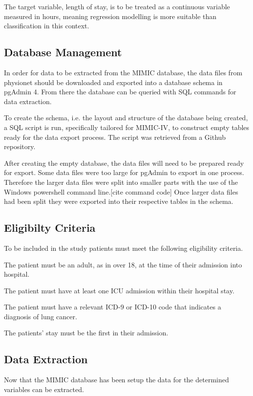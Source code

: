 \documentclass[11pt]{article}
\begin{document}
The target variable, length of stay, is to be treated as a continuous variable measured in hours, meaning regression modelling is more suitable than classification in this context.

\subsection{Database Management}
In order for data to be extracted from the MIMIC database, the data files from physionet should be downloaded and exported into a database schema in pgAdmin 4. From there the database can be queried with SQL commands for data extraction.

To create the schema, i.e. the layout and structure of the database being created, a SQL script is run, specifically tailored for MIMIC-IV, to construct empty tables ready for the data export process. The script was retrieved from a Github repository.\cite{SQLcode}

After creating the empty database, the data files will need to be prepared ready for export. Some data files were too large for pgAdmin to export in one process. Therefore the larger data files were split into smaller parts with the use of the Windows powershell command line.[cite command code] Once larger data files had been split they were exported into their respective tables in the schema.

\subsection{Eligibilty Criteria}

To be included in the study patients must meet the following eligibility criteria.

The patient must be an adult, as in over 18, at the time of their admission into hospital.

The patient must have at least one ICU admission within their hospital stay.

The patient must have a relevant ICD-9 or ICD-10 code that indicates a diagnosis of lung cancer.

The patients' stay must be the first in their admission.

\subsection{Data Extraction}
Now that the MIMIC database has been setup the data for the determined variables can be extracted.
\end{document}
